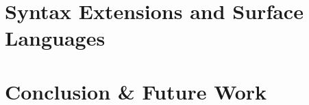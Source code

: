 \documentclass{llncs}
\begin{document}
\section{Syntax Extensions and Surface Languages}\label{sec:syntax}

 
\section{Conclusion \& Future Work}\label{sec:concl}
 



%  
\end{document}
